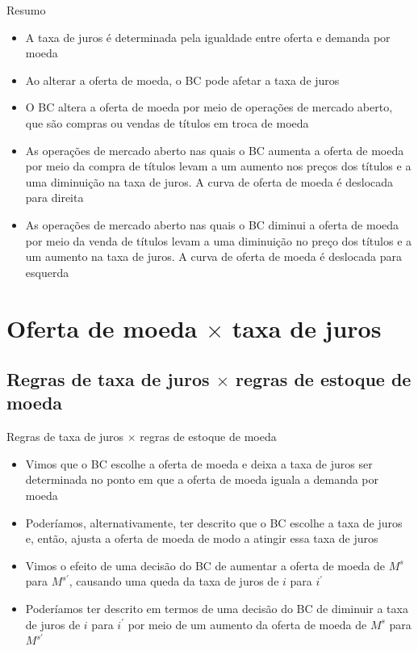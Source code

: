 \documentclass[10pt]{beamer}
\begin{document}
\begin{frame}{Resumo}
    \begin{itemize}
        \item A taxa de juros é determinada pela igualdade entre oferta e demanda por moeda
        \bigskip
        \item Ao alterar a oferta de moeda, o BC pode afetar a taxa de juros
        \bigskip
        \item O BC altera a oferta de moeda por meio de operações de mercado aberto, que são compras ou vendas de títulos em troca de moeda
        \bigskip
        \item As operações de mercado aberto nas quais o BC aumenta a oferta de moeda por meio da compra de títulos levam a um aumento nos preços dos títulos e a uma diminuição na taxa de juros. A curva de oferta de moeda é deslocada para direita
        \bigskip
        \item As operações de mercado aberto nas quais o BC diminui a oferta de moeda por meio da venda de títulos levam a uma diminuição no preço dos títulos e a um aumento na taxa de juros. A curva de oferta de moeda é deslocada para esquerda
    \end{itemize}
\end{frame}

\section{Oferta de moeda $\times$ taxa de juros}
\subsection{Regras de taxa de juros $\times$ regras de estoque de moeda}
\begin{frame}{Regras de taxa de juros $\times$ regras de estoque de moeda}
\begin{itemize}
    \item Vimos que o BC escolhe a oferta de moeda e deixa a taxa de juros ser determinada no ponto em que a oferta de moeda iguala a demanda por moeda
    \bigskip
    \item Poderíamos, alternativamente, ter descrito que o BC escolhe a taxa de juros e, então, ajusta a oferta de moeda de modo a atingir essa taxa de juros
    \bigskip
    \item Vimos o efeito de uma decisão do BC de aumentar a oferta de moeda de $M^s$ para $M^{s'}$, causando uma queda da taxa de juros de $i$ para $i^{'}$
    \bigskip
    \item Poderíamos ter descrito em termos de uma decisão do BC de diminuir a taxa de juros de $i$ para $i^{'}$ por meio de um aumento da oferta de moeda de $M^s$ para $M^{s'}$
\end{itemize}
\end{frame}
\end{document}
